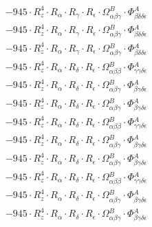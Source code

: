 \documentclass{article}
\begin{document}
\begin{subequations}
\begin{gather}
\begin{array}{c}
 \\[0.2em] 		 - 945 \cdot R_{z}^{4} \cdot R_{\alpha{}} \cdot R_{\gamma{}} \cdot R_{\epsilon{}} \cdot \Omega{}^{B}_{\alpha{}\beta{}\gamma{}} \cdot \Phi{}^{A}_{\beta{}\delta{}\delta{}\epsilon{}} 
 \\[0.2em] 		 - 945 \cdot R_{z}^{4} \cdot R_{\alpha{}} \cdot R_{\gamma{}} \cdot R_{\epsilon{}} \cdot \Omega{}^{B}_{\alpha{}\beta{}\gamma{}} \cdot \Phi{}^{A}_{\beta{}\delta{}\delta{}\epsilon{}} 
 \\[0.2em] 		 - 945 \cdot R_{z}^{4} \cdot R_{\alpha{}} \cdot R_{\gamma{}} \cdot R_{\epsilon{}} \cdot \Omega{}^{B}_{\alpha{}\beta{}\gamma{}} \cdot \Phi{}^{A}_{\beta{}\delta{}\delta{}\epsilon{}} 
 \\[0.2em] 		 - 945 \cdot R_{z}^{4} \cdot R_{\alpha{}} \cdot R_{\delta{}} \cdot R_{\epsilon{}} \cdot \Omega{}^{B}_{\alpha{}\beta{}\beta{}} \cdot \Phi{}^{A}_{\gamma{}\gamma{}\delta{}\epsilon{}} 
 \\[0.2em] 		 - 945 \cdot R_{z}^{4} \cdot R_{\alpha{}} \cdot R_{\delta{}} \cdot R_{\epsilon{}} \cdot \Omega{}^{B}_{\alpha{}\beta{}\gamma{}} \cdot \Phi{}^{A}_{\beta{}\gamma{}\delta{}\epsilon{}} 
 \\[0.2em] 		 - 945 \cdot R_{z}^{4} \cdot R_{\alpha{}} \cdot R_{\delta{}} \cdot R_{\epsilon{}} \cdot \Omega{}^{B}_{\alpha{}\beta{}\gamma{}} \cdot \Phi{}^{A}_{\beta{}\gamma{}\delta{}\epsilon{}} 
 \\[0.2em] 		 - 945 \cdot R_{z}^{4} \cdot R_{\alpha{}} \cdot R_{\delta{}} \cdot R_{\epsilon{}} \cdot \Omega{}^{B}_{\alpha{}\beta{}\beta{}} \cdot \Phi{}^{A}_{\gamma{}\gamma{}\delta{}\epsilon{}} 
 \\[0.2em] 		 - 945 \cdot R_{z}^{4} \cdot R_{\alpha{}} \cdot R_{\delta{}} \cdot R_{\epsilon{}} \cdot \Omega{}^{B}_{\alpha{}\beta{}\gamma{}} \cdot \Phi{}^{A}_{\beta{}\gamma{}\delta{}\epsilon{}} 
 \\[0.2em] 		 - 945 \cdot R_{z}^{4} \cdot R_{\alpha{}} \cdot R_{\delta{}} \cdot R_{\epsilon{}} \cdot \Omega{}^{B}_{\alpha{}\beta{}\gamma{}} \cdot \Phi{}^{A}_{\beta{}\gamma{}\delta{}\epsilon{}} 
 \\[0.2em] 		 - 945 \cdot R_{z}^{4} \cdot R_{\alpha{}} \cdot R_{\delta{}} \cdot R_{\epsilon{}} \cdot \Omega{}^{B}_{\alpha{}\beta{}\beta{}} \cdot \Phi{}^{A}_{\gamma{}\gamma{}\delta{}\epsilon{}} 
 \\[0.2em] 		 - 945 \cdot R_{z}^{4} \cdot R_{\alpha{}} \cdot R_{\delta{}} \cdot R_{\epsilon{}} \cdot \Omega{}^{B}_{\alpha{}\beta{}\gamma{}} \cdot \Phi{}^{A}_{\beta{}\gamma{}\delta{}\epsilon{}} 
 \\[0.2em] 		 - 945 \cdot R_{z}^{4} \cdot R_{\alpha{}} \cdot R_{\delta{}} \cdot R_{\epsilon{}} \cdot \Omega{}^{B}_{\alpha{}\beta{}\gamma{}} \cdot \Phi{}^{A}_{\beta{}\gamma{}\delta{}\epsilon{}} 

\end{array}
\end{gather}
\end{subequations}
\end{document}
